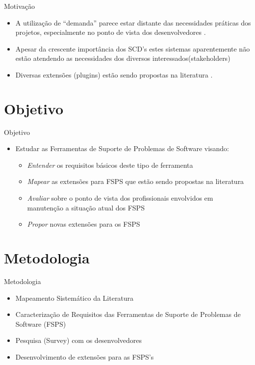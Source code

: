 \documentclass[t,14pt,mathserif]{beamer}
\begin{document}
\begin{frame}{Motivação}

	\begin{itemize}
		\item A utilização de  ``demanda'' parece estar distante das necessidades práticas dos projetos, especialmente no ponto de vista dos desenvolvedores \cite{Baysal:2013:SAP:2486788.2486957}.
		\item Apesar da crescente importância dos SCD's estes sistemas aparentemente não estão atendendo as necessidades dos diversos interessados(stakeholders)
		\item Diversas extensões (plugins) estão sendo propostas na literatura \cite{101186,Thung:2014:BIT:2635868.2661678,Kononenko:2014:DED:2591062.2591075}.
	\end{itemize}
\end{frame}


\section{Objetivo}

\begin{frame}{Objetivo}

	\begin{itemize}
		\item Estudar as Ferramentas de Suporte de Problemas de Software visando:

			\begin{itemize}
				\item \textit{Entender} os requisitos básicos deste tipo de ferramenta
				\item \textit{Mapear} as extensões para FSPS que estão sendo propostas na literatura
				\item \textit{Avaliar} sobre o ponto de vista dos profissionais envolvidos em manutenção  a situação atual dos FSPS
				\item \textit{Propor} novas extensões para os FSPS
			\end{itemize}

	\end{itemize}	

\end{frame}

\section{Metodologia}
\begin{frame}{Metodologia}
	\begin{itemize}
		\item Mapeamento Sistemático da Literatura \cite{kitchenham2007guidelines}
		\item Caracterização de Requisitos das Ferramentas de Suporte de Problemas de Software (FSPS)
		\item Pesquisa (Survey) com os desenvolvedores \cite{wohlin2012experimentation}
		\item Desenvolvimento de extensões para as FSPS's
	\end{itemize}
\end{frame}
\end{document}
